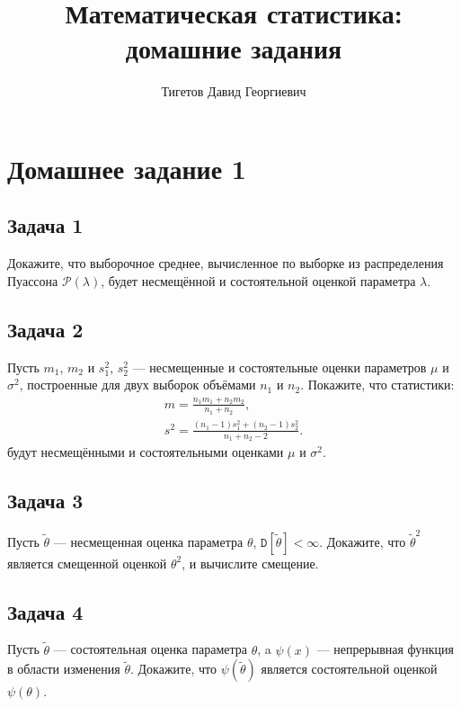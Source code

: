 \documentclass[a4paper,12pt]{article}
\newcommand{\variance}[1]{\mathtt{D} \left[ #1 \right]}
\begin{document}
\title{Математическая статистика: домашние задания}
\author{Тигетов Давид Георгиевич}
\maketitle

\section*{Домашнее задание 1}

\subsection*{Задача 1 \cite[108]{Efimov}}

Докажите, что выборочное среднее, вычисленное по выборке из распределения Пуассона $\mathcal{P}(\lambda)$, будет несмещённой и состоятельной оценкой
параметра $\lambda$.

\subsection*{Задача 2 \cite[103]{Efimov}}

Пусть $m_1$, $m_2$ и $s_1^2$, $s_2^2$ --- несмещенные и состоятельные оценки параметров $\mu$ и $\sigma^2$, построенные для двух выборок
объёмами $n_1$ и $n_2$. Покажите, что статистики:
\begin{gather*}
    m = \frac{n_1 m_1 + n_2 m_2}{n_1 + n_2} , \\
    s^2 = \frac{(n_1 - 1) s_1^2 + (n_2 - 1) s_2^2}{n_1 + n_2 - 2} .
\end{gather*}
будут несмещёнными и состоятельными оценками $\mu$ и $\sigma^2$.

\subsection*{Задача 3 \cite[107]{Efimov}}

Пусть $\widetilde{\theta}$ --- несмещенная оценка параметра $\theta$, $\variance{\widetilde{\theta}} < \infty$. Докажите, что
$\widetilde{\theta}^2$ является смещенной оценкой $\theta^2$, и вычислите смещение.

\subsection*{Задача 4 \cite[110]{Efimov}}

Пусть $\widetilde{\theta}$ --- состоятельная оценка параметра $\theta$, a $\psi(x)$ --- непрерывная функция в области изменения $\widetilde{\theta}$.
Докажите, что $\psi(\widetilde{\theta})$ является состоятельной оценкой $\psi(\theta)$.
\end{document}
